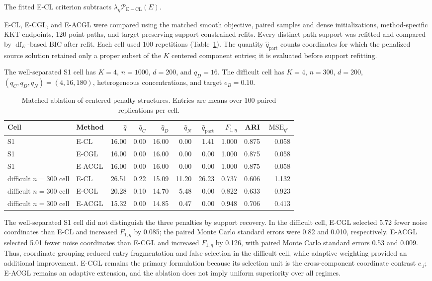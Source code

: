 \documentclass[preprint,12pt,authoryear]{elsarticle}
\begin{document}
The fitted E-CL criterion subtracts
$\lambda_\eta\mathcal P_{\mathrm{E-CL}}(E)$.

E-CL, E-CGL, and E-ACGL were compared using the matched smooth
objective, paired samples and dense initializations, method-specific KKT
endpoints, 120-point paths, and target-preserving support-constrained refits.
Every distinct path support was refitted and compared by
$\operatorname{df}_E$-based BIC after refit. Each cell used
100 repetitions (Table~\ref{tab:s-penalty-ablation}). The quantity
$\widehat q_{\mathrm{part}}$ counts coordinates for which the penalized source
solution retained only a proper subset of the $K$ centered component entries;
it is evaluated before support refitting.

The well-separated S1 cell has $K=4$, $n=1000$, $d=200$, and
$q_D=16$. The difficult cell has $K=4$, $n=300$, $d=200$,
$(q_C,q_D,q_N)=(4,16,180)$, heterogeneous concentrations, and target
$e_B=0.10$.

\begin{table}[H]
\centering
\footnotesize
\setlength{\tabcolsep}{2.5pt}
\caption{Matched ablation of centered penalty structures. Entries are means
over 100 paired replications per cell.}
\label{tab:s-penalty-ablation}
\begin{tabular*}{\textwidth}{@{\extracolsep{\fill}}llrrrrrrrr@{}}
\toprule
Cell & Method & $\widehat q$ & $\widehat q_C$ & $\widehat q_D$ & $\widehat q_N$ & $\widehat q_{\mathrm{part}}$ & $F_{1,\eta}$ & ARI & $\operatorname{MSE}_{\eta^c}$ \\
\midrule
S1 & E-CL & 16.00 & 0.00 & 16.00 & 0.00 & 1.41 & 1.000 & 0.875 & 0.058 \\
S1 & E-CGL & 16.00 & 0.00 & 16.00 & 0.00 & 0.00 & 1.000 & 0.875 & 0.058 \\
S1 & E-ACGL & 16.00 & 0.00 & 16.00 & 0.00 & 0.00 & 1.000 & 0.875 & 0.058 \\
difficult $n=300$ cell & E-CL & 26.51 & 0.22 & 15.09 & 11.20 & 26.23 & 0.737 & 0.606 & 1.132 \\
difficult $n=300$ cell & E-CGL & 20.28 & 0.10 & 14.70 & 5.48 & 0.00 & 0.822 & 0.633 & 0.923 \\
difficult $n=300$ cell & E-ACGL & 15.32 & 0.00 & 14.85 & 0.47 & 0.00 & 0.948 & 0.706 & 0.413 \\
\bottomrule
\end{tabular*}
\end{table}

The well-separated S1 cell did not distinguish the three penalties by support
recovery. In the difficult cell, E-CGL selected 5.72 fewer noise coordinates
than E-CL and increased $F_{1,\eta}$ by 0.085; the paired Monte Carlo standard errors
were 0.82 and 0.010, respectively. E-ACGL selected 5.01 fewer noise
coordinates than E-CGL and increased $F_{1,\eta}$ by 0.126, with paired Monte Carlo
standard errors 0.53 and 0.009. Thus, coordinate grouping reduced entry
fragmentation and false selection in the difficult cell, while adaptive
weighting provided an additional improvement. E-CGL remains the primary
formulation because its selection unit is the cross-component coordinate
contrast $c_{\cdot j}$; E-ACGL remains an adaptive extension, and the ablation
does not imply uniform superiority over all regimes.
\end{document}
